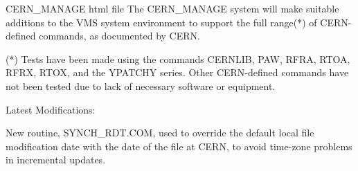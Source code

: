 \begin{XMPt}{CERN\_MANAGE html file}
The CERN_MANAGE system will make suitable additions to the VMS
system environment to support the full range(*) of CERN-defined
commands, as documented by CERN.  

(*) Tests have been made using the commands CERNLIB, PAW, RFRA,
RTOA, RFRX, RTOX, and the YPATCHY series.  Other CERN-defined
commands have not been tested due to lack of necessary software or
equipment.  

Latest Modifications: 

New routine, SYNCH_RDT.COM, used to override the default local
file modification date with the date of the file at CERN, to avoid
time-zone problems in incremental updates.  

\end{XMPt}
